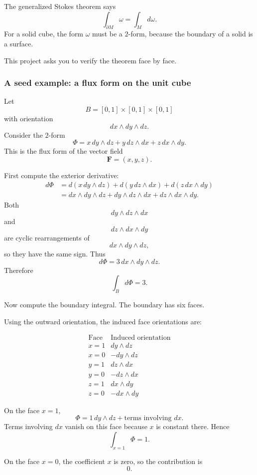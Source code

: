 The generalized Stokes theorem says
\[
\boxed{
    \int_{\partial M}\omega=\int_M d\omega.
}
\]
For a solid cube, the form \(\omega\) must be a \(2\)-form, because the boundary of a
solid is a surface.

This project asks you to verify the theorem face by face.

\subsubsection*{A seed example: a flux form on the unit cube}

Let
\[
    B=[0,1]\times[0,1]\times[0,1]
\]
with orientation
\[
    dx\wedge dy\wedge dz.
\]
Consider the \(2\)-form
\[
\boxed{
    \Phi
    =
    x\,dy\wedge dz
    +
    y\,dz\wedge dx
    +
    z\,dx\wedge dy.
}
\]
This is the flux form of the vector field
\[
    \mathbf F=(x,y,z).
\]

First compute the exterior derivative:
\[
\begin{aligned}
d\Phi
&=
d(x\,dy\wedge dz)
+
d(y\,dz\wedge dx)
+
d(z\,dx\wedge dy)\\
&=
dx\wedge dy\wedge dz
+
dy\wedge dz\wedge dx
+
dz\wedge dx\wedge dy.
\end{aligned}
\]
Both
\[
    dy\wedge dz\wedge dx
\]
and
\[
    dz\wedge dx\wedge dy
\]
are cyclic rearrangements of
\[
    dx\wedge dy\wedge dz,
\]
so they have the same sign.  Thus
\[
\boxed{
    d\Phi=3\,dx\wedge dy\wedge dz.
}
\]
Therefore
\[
\boxed{
    \int_B d\Phi=3.
}
\]

Now compute the boundary integral.  The boundary has six faces.

Using the outward orientation, the induced face orientations are:

\[
\begin{array}{c|c}
\text{Face} & \text{Induced orientation} \\ \hline
x=1 & dy\wedge dz\\
x=0 & -dy\wedge dz\\
y=1 & dz\wedge dx\\
y=0 & -dz\wedge dx\\
z=1 & dx\wedge dy\\
z=0 & -dx\wedge dy
\end{array}
\]

On the face \(x=1\),
\[
    \Phi=1\,dy\wedge dz+\text{terms involving }dx.
\]
Terms involving \(dx\) vanish on this face because \(x\) is constant there.  Hence
\[
    \int_{x=1}\Phi=1.
\]

On the face \(x=0\), the coefficient \(x\) is zero, so the contribution is
\[
    0.
\]

